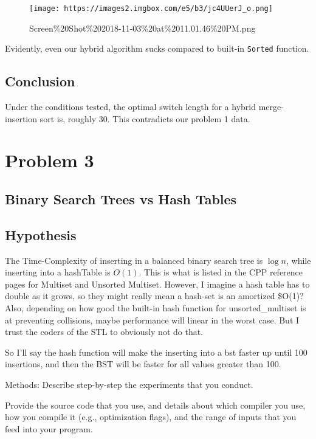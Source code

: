 \documentclass[11pt]{article}
\makeatletter
\def\maxwidth{\ifdim\Gin@nat@width>\linewidth\linewidth
    \else\Gin@nat@width\fi}
\let\Oldincludegraphics\includegraphics
\renewcommand{\includegraphics}[1]{\Oldincludegraphics[width=.8\maxwidth]{#1}}
\makeatother
\begin{document}
    \begin{figure}
\centering
\texttt{[image: https://images2.imgbox.com/e5/b3/jc4UUerJ\_o.png]}
\caption{Screen\%20Shot\%202018-11-03\%20at\%2011.01.46\%20PM.png}
\end{figure}

Evidently, even our hybrid algorithm sucks compared to built-in
\texttt{Sorted} function.

    \subsection{Conclusion}\label{conclusion}

Under the conditions tested, the optimal switch length for a hybrid
merge-insertion sort is, roughly 30. This contradicts our problem 1
data.

    \section{Problem 3}\label{problem-3}

\subsection{Binary Search Trees vs Hash
Tables}\label{binary-search-trees-vs-hash-tables}

    \subsection{Hypothesis}\label{hypothesis}

The Time-Complexity of inserting in a balanced binary search tree is
\(\log{n}\), while inserting into a hashTable is \(O(1)\). This is what
is listed in the CPP reference pages for Multiset and Unsorted Multiset.
However, I imagine a hash table has to double as it grows, so they might
really mean a hash-set is an amortized \$O(1)? Also, depending on how
good the built-in hash function for unsorted\_multiset is at preventing
collisions, maybe performance will linear in the worst case. But I trust
the coders of the STL to obviously not do that.

So I'll say the hash function will make the inserting into a bst faster
up until 100 insertions, and then the BST will be faster for all values
greater than 100.

    Methods: Describe step-by-step the experiments that you conduct.

Provide the source code that you use, and details about which compiler
you use, how you compile it (e.g., optimization flags), and the range of
inputs that you feed into your program.
\end{document}
